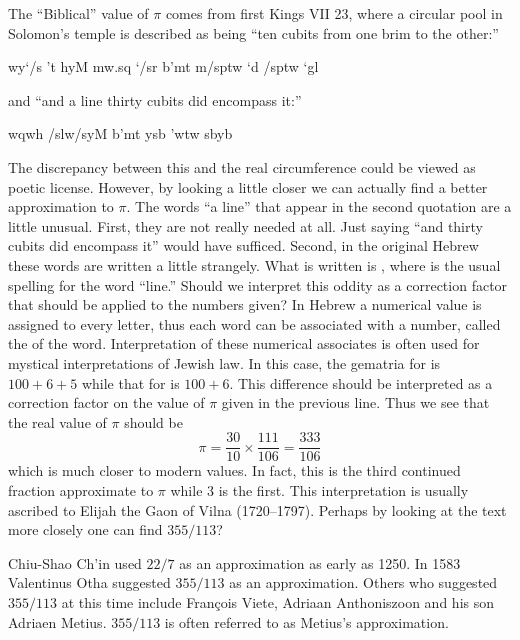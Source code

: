 The ``Biblical'' value of $\pi$ comes from first Kings VII 23, where a
circular pool in Solomon's temple is described as being ``ten cubits from
one brim to the other:''

\begin{cjhebrew}
wy`/s 't hyM mw.sq `/sr b'mt m/sptw `d /sptw `gl 
\end{cjhebrew}

\noindent
and ``and a line thirty cubits did encompass it:''

\begin{cjhebrew}
wqwh /slw/syM b'mt ysb 'wtw sbyb
\end{cjhebrew}

\noindent
The discrepancy between this and the real circumference could be viewed
as poetic license.  However, by looking a little closer we can actually
find a better approximation to $\pi$.  The words ``a line'' that appear in
the second quotation are a little unusual.  First, they are not
really needed at all.  Just saying ``and thirty cubits did encompass it''
would have sufficed.  Second, in the original Hebrew these words are
written a little strangely.  What is written is , where
 is the usual spelling for the word ``line.''  Should we interpret
this oddity as a correction factor that should be applied to the
numbers given?  In Hebrew a numerical value is assigned to every
letter, thus each word can be associated with a number, called the
 of the word.  Interpretation of these numerical
associates is often used for mystical interpretations of Jewish law.
In this case, the gematria for  is $100+6+5$ while that for
 is $100+6$.  This difference should be interpreted as a
correction factor on the value of $\pi$ given in the previous line.
Thus we see that the real value of $\pi$ 
should be 
\[
\pi = \frac{30}{10} \times \frac{111}{106} = \frac{333}{106}
\]
which is much closer to modern values.  In fact, this is the third
continued fraction approximate to $\pi$ while $3$ is the first.  This
interpretation is usually ascribed to Elijah the Gaon of
Vilna (1720--1797).  Perhaps by looking
at the text more closely one can find $355/113$?

Chiu-Shao Ch'in used $22/7$ as an approximation
as early as 1250.  In 1583 Valentinus Otha
suggested $355/113$ as an approximation.  Others who suggested
$355/113$ at this time include Fran\c{c}ois Viete, Adriaan Anthoniszoon and
his son Adriaen Metius. $355/113$ is often
referred to as Metius's approximation.

